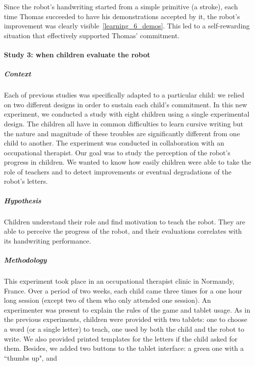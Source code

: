\documentclass[10pt,a4paper]{article}
\begin{document}
Since the robot's handwriting started from a simple primitive (a stroke), each
time Thomas succeeded to have his demonstrations accepted by it, the robot's
improvement was clearly visible~\ref{learning_6_demos}.
This led to a self-rewarding situation that effectively supported Thomas'
commitment.



\paragraph{Study 3: when children evaluate the robot}
\subparagraph{Context}
Each of previous studies was specifically adapted to a particular child: we relied on two different
designs in order to sustain each child's commitment.
In this new experiment, we conducted a study with eight children using a single experimental design. The children all have in common difficulties to learn
cursive writing but the nature and magnitude of these troubles are significantly
different from one child to another. The experiment was conducted in collaboration with an occupational therapist. Our goal was to study the perception of the robot's progress in children. We wanted to know how easily children were able to take the role of teachers and to detect improvements or eventual degradations of the robot's letters.
\subparagraph{Hypothesis}
Children understand their role and find motivation to teach the robot. They are able to perceive the progress of the robot, and their evaluations correlates with its handwriting performance.
\subparagraph{Methodology}
This experiment took place in an occupational therapist clinic
in Normandy, France. Over a period of two weeks, each child came three times for a one hour long
session (except two of them who only attended one session). An experimenter was present to explain the rules of the game and tablet usage. As in the previous experiments, children were provided with two tablets: one to choose a word (or a single letter) to teach, one
used by both the child and the robot to write. We also provided printed templates for the letters if the child asked for them. 
Besides, we added two buttons to the tablet interface: a green one with a ``thumbs up", and
\end{document}
